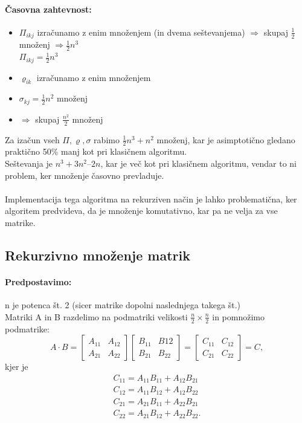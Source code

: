 \documentclass[a4paper,10pt]{article}
\begin{document}
\paragraph{\v Casovna zahtevnost:}
\begin{itemize}
\item $\Pi_{ikj}$ izra\v cunamo z enim mno\v zenjem (in dvema se\v stevanjema) $\Rightarrow$ skupaj $\frac{1}{2}$ mno\v zenj $\Rightarrow \frac{1}{2} n^3$\\
$\Pi_{ikj} = \frac{1}{2} n^3$
\item $\varrho_{ik}$ izra\v cunamo z enim mno\v zenjem
\item $\sigma_{kj} = \frac{1}{2} n^2$ mno\v zenj
\item $\Rightarrow$ skupaj $\frac{n^2}{2}$ mno\v zenj
\end{itemize}
Za iza\v cun vseh $\Pi, \varrho, \sigma$ rabimo $\frac{1}{2} n^3 + n^2$ mno\v zenj, kar je asimptoti\v cno gledano prakti\v cno 50\% manj kot pri klasi\v cnem algoritmu.\\
Se\v stevanja je $n^3 + 3 n^2 – 2n$, kar je ve\v c kot pri klasi\v cnem algoritmu, vendar to ni problem, ker mno\v zenje \v casovno prevladuje.\\
\\
Implementacija tega algoritma na rekurziven na\v cin je lahko problemati\v cna, ker algoritem predvideva, da je mno\v zenje komutativno, kar pa ne velja za vse matrike.

\subsection{Rekurzivno mno\v zenje matrik}

\paragraph{Predpostavimo:}
n je potenca \v st. 2 (sicer matrike dopolni naslednjega takega \v st.)\\
Matriki A in B razdelimo na podmatriki velikosti $\frac{n}{2} \times \frac{n}{2}$ in pomno\v zimo podmatrike:
$$
A \cdot B = \left[
\begin{array}{ll}
A_{11} & A_{12}\\
A_{21} & A_{22}
\end{array}
\right]
\left[
\begin{array}{ll}
B_{11} & B{12}\\
B_{21} & B_{22}
\end{array}
\right] =
\left[
\begin{array}{ll}
C_{11} & C_{12}\\
C_{21} & C_{22}
\end{array}
\right] = C,
$$
kjer je
\begin{eqnarray*}
C_{11} = A_{11}B_{11} + A_{12}B_{21}\\
C_{12} = A_{11}B_{12} + A_{12}B_{22}\\
C_{21} = A_{21}B_{11} + A_{22}B_{21}\\
C_{22} = A_{21}B_{12} + A_{22}B_{22}.
\end{eqnarray*}
\end{document}
